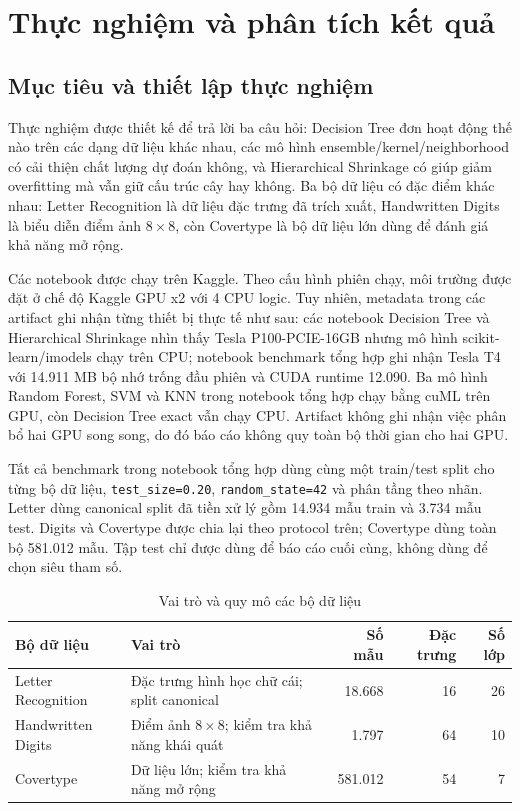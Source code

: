 \chapter{Thực nghiệm và phân tích kết quả}

\section{Mục tiêu và thiết lập thực nghiệm}

Thực nghiệm được thiết kế để trả lời ba câu hỏi: Decision Tree đơn hoạt động thế nào trên
các dạng dữ liệu khác nhau, các mô hình ensemble/kernel/neighborhood có cải thiện chất
lượng dự đoán không, và Hierarchical Shrinkage có giúp giảm overfitting mà vẫn giữ cấu trúc
cây hay không. Ba bộ dữ liệu có đặc điểm khác nhau: Letter Recognition là dữ liệu đặc trưng
đã trích xuất, Handwritten Digits là biểu diễn điểm ảnh $8\times8$, còn Covertype là bộ dữ
liệu lớn dùng để đánh giá khả năng mở rộng.

Các notebook được chạy trên Kaggle. Theo cấu hình phiên chạy, môi trường được đặt ở chế độ
Kaggle GPU x2 với 4 CPU logic. Tuy nhiên, metadata trong các artifact ghi nhận từng thiết
bị thực tế như sau: các notebook Decision Tree và Hierarchical Shrinkage nhìn thấy Tesla
P100-PCIE-16GB nhưng mô hình scikit-learn/imodels chạy trên CPU; notebook benchmark tổng
hợp ghi nhận Tesla T4 với 14.911 MB bộ nhớ trống đầu phiên và CUDA runtime 12.090. Ba mô
hình Random Forest, SVM và KNN trong notebook tổng hợp chạy bằng cuML trên GPU, còn
Decision Tree exact vẫn chạy CPU. Artifact không ghi nhận việc phân bổ hai GPU song song,
do đó báo cáo không quy toàn bộ thời gian cho hai GPU.

Tất cả benchmark trong notebook tổng hợp dùng cùng một train/test split cho từng bộ dữ liệu,
\texttt{test\_size=0.20}, \texttt{random\_state=42} và phân tầng theo nhãn. Letter dùng
canonical split đã tiền xử lý gồm 14.934 mẫu train và 3.734 mẫu test. Digits và Covertype
được chia lại theo protocol trên; Covertype dùng toàn bộ 581.012 mẫu. Tập test chỉ được
dùng để báo cáo cuối cùng, không dùng để chọn siêu tham số.

\begin{table}[H]
    \centering
    \caption{Vai trò và quy mô các bộ dữ liệu}
    \label{tab:dataset-summary}
    \small
    \begin{tabularx}{\textwidth}{@{}lXrrr@{}}
        \toprule
        \textbf{Bộ dữ liệu} & \textbf{Vai trò} & \textbf{Số mẫu} & \textbf{Đặc trưng} & \textbf{Số lớp} \\
        \midrule
        Letter Recognition & Đặc trưng hình học chữ cái; split canonical & 18.668 & 16 & 26 \\
        Handwritten Digits & Điểm ảnh $8\times8$; kiểm tra khả năng khái quát & 1.797 & 64 & 10 \\
        Covertype & Dữ liệu lớn; kiểm tra khả năng mở rộng & 581.012 & 54 & 7 \\
        \bottomrule
    \end{tabularx}
\end{table}

